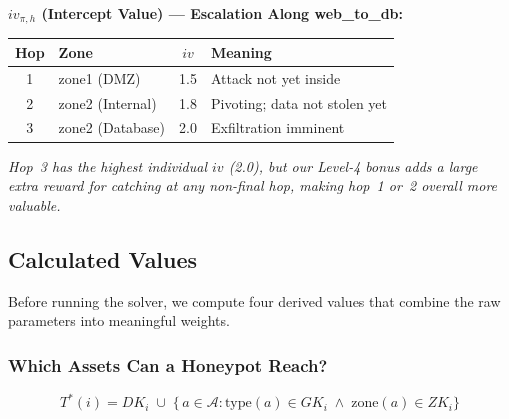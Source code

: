 \documentclass[journal]{IEEEtran}
\newcommand{\calA}{\mathcal{A}}
\begin{document}
\begin{examplebox}
\textbf{$iv_{\pi,h}$ (Intercept Value) ---
Escalation Along web\_to\_db:}
\begin{center}
\small
\renewcommand{\arraystretch}{1.1}
\begin{tabular}{@{}clcl@{}}
\toprule
\textbf{Hop} & \textbf{Zone} & $iv$ & \textbf{Meaning} \\
\midrule
1 & zone1 (DMZ)      & 1.5 & Attack not yet inside \\
2 & zone2 (Internal) & 1.8 & Pivoting; data not stolen yet \\
3 & zone2 (Database) & 2.0 & Exfiltration imminent \\
\bottomrule
\end{tabular}
\end{center}
\textit{Hop~3 has the highest individual $iv$ (2.0), but our
Level-4 bonus adds a large extra reward for catching at any
\emph{non-final} hop, making hop~1 or~2 overall more
valuable.}
\end{examplebox}

\subsection{Calculated Values}

Before running the solver, we compute four derived values
that combine the raw parameters into meaningful weights.

\subsubsection{Which Assets Can a Honeypot Reach?}
\begin{equation}
  T^*(i) = DK_i \;\cup\;
  \bigl\{\,a \in \calA :
    \mathrm{type}(a) \in GK_i \;\wedge\;
    \mathrm{zone}(a) \in ZK_i \bigr\}
\end{equation}
\end{document}
